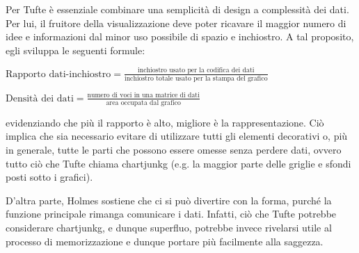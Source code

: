 Per Tufte è essenziale combinare una semplicità di design a complessità dei dati. Per lui, il fruitore della visualizzazione deve poter ricavare il maggior numero di idee e informazioni dal minor uso possibile di spazio e inchiostro.
A tal proposito, egli sviluppa le seguenti formule: 
\begin{center}
    $\text{Rapporto dati-inchiostro} = \frac{\text{inchiostro usato per la codifica dei dati}}{\text{inchiostro totale usato per la stampa del grafico}}$
\end{center}
\begin{center}
    $\text{Densità dei dati} = \frac{\text{numero di voci in una matrice di dati}}{\text{area occupata dal grafico}}$            %
\end{center}
evidenziando che più il rapporto è alto, migliore è la rappresentazione. Ciò implica che sia necessario evitare di utilizzare tutti gli elementi decorativi o, più in generale, tutte le parti che possono essere omesse 
senza perdere dati, ovvero tutto ciò che Tufte chiama \gls{chartjunkg} (e.g. la maggior parte delle griglie e sfondi posti sotto i grafici).

D'altra parte, Holmes sostiene che ci si può divertire con la forma, purché la funzione principale rimanga comunicare i dati. Infatti, ciò che Tufte potrebbe considerare \gls{chartjunkg}, e dunque superfluo,
potrebbe invece rivelarsi utile al processo di memorizzazione e dunque portare più facilmente alla saggezza. 

